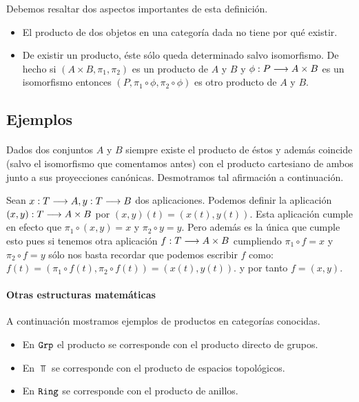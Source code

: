 Debemos resaltar dos aspectos importantes de esta definición.
\begin{itemize}
\item El producto de dos objetos en una categoría dada no tiene por qué
      existir.
\item De existir un producto, éste sólo queda determinado salvo isomorfismo. De hecho si $(A\times B, \pi_1, \pi_2)$ es un producto de $A$ y $B$
y $\phi : P\longrightarrow A\times B$ es un isomorfismo entonces
$(P, \pi_1 \circ \phi , \pi_2 \circ \phi)$ es otro producto de $A$
y $B$.
\end{itemize}

\subsection{Ejemplos}
\paragraph{\Set}
Dados dos conjuntos $A$ y $B$ siempre existe el producto de éstos
y además coincide (salvo el isomorfismo
que comentamos antes) con el producto cartesiano de ambos
junto a sus proyecciones canónicas. Desmotramos tal
afirmación a continuación.

Sean $x: T\longrightarrow A, y: T\longrightarrow B$ dos aplicaciones. Podemos
definir la aplicación $(x, y) :T\longrightarrow A\times B$ por
$(x, y)(t) = (x(t), y(t))$. Esta aplicación cumple en efecto que
$\pi_1 \circ (x, y) = x$ y $\pi_2 \circ y = y$. Pero además es la única
que cumple esto pues si tenemos otra aplicación
$f : T\longrightarrow A\times B$ cumpliendo $\pi_1 \circ f = x$ y
$\pi_2 \circ f = y$ sólo nos basta recordar que podemos
escribir $f$ como:
$f(t)=(\pi_1\circ f(t), \pi_2\circ f(t))=(x(t), y(t))$.
y por tanto $f = (x, y)$.

\paragraph{Otras estructuras matemáticas}
A continuación mostramos ejemplos de productos
en categorías conocidas.

\begin{itemize}
\item En $\texttt{Grp}$ el producto se corresponde con el
producto directo de grupos.
\item En $\Top$ se corresponde con el producto de espacios topológicos.
\item En $\texttt{Ring}$ se corresponde con el producto de anillos.
\end{itemize}

